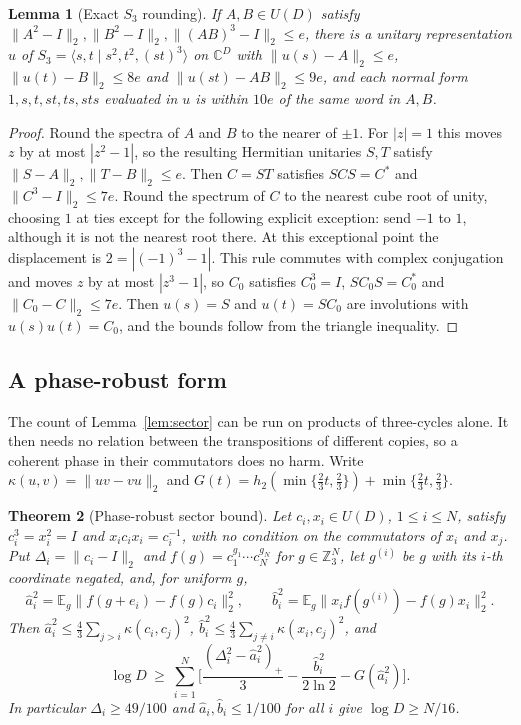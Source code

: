 \documentclass[11pt,a4paper]{article}
\theoremstyle{plain}
\newtheorem{theorem}{Theorem}[section]
\newtheorem{lemma}[theorem]{Lemma}
\theoremstyle{definition}
\theoremstyle{remark}
\begin{document}
\begin{lemma}[Exact $S_3$ rounding]\label{lem:s3round}
If $A,B\in U(D)$ satisfy $\|A^2-I\|_2,\|B^2-I\|_2,\|(AB)^3-I\|_2\le e$, there is a unitary representation $u$ of
$S_3=\langle s,t\mid s^2,t^2,(st)^3\rangle$ on $\mathbb C^D$ with $\|u(s)-A\|_2\le e$, $\|u(t)-B\|_2\le8e$ and $\|u(st)-AB\|_2\le9e$, and
each normal form $1,s,t,st,ts,sts$ evaluated in $u$ is within $10e$ of the same word in $A,B$.
\end{lemma}

\begin{proof}
Round the spectra of $A$ and $B$ to the nearer of $\pm1$. For $|z|=1$ this moves $z$ by at most $|z^2-1|$, so the resulting
Hermitian unitaries $S,T$ satisfy $\|S-A\|_2,\|T-B\|_2\le e$. Then $C=ST$ satisfies $SCS=C^*$ and $\|C^3-I\|_2\le7e$. Round the spectrum
of $C$ to the nearest cube root of unity, choosing $1$ at ties except for the following explicit exception: send $-1$ to $1$, although
it is not the nearest root there. At this exceptional point the displacement is $2=|(-1)^3-1|$. This rule commutes with complex conjugation and moves
$z$ by at most $|z^3-1|$, so $C_0$ satisfies $C_0^3=I$, $SC_0S=C_0^*$ and $\|C_0-C\|_2\le7e$. Then $u(s)=S$ and $u(t)=SC_0$ are
involutions with $u(s)u(t)=C_0$, and the bounds follow from the triangle inequality.
\end{proof}

\subsection{A phase-robust form}

The count of Lemma~\ref{lem:sector} can be run on products of three-cycles alone. It then needs no relation between the
transpositions of different copies, so a coherent phase in their commutators does no harm. Write $\kappa(u,v)=\|uv-vu\|_2$ and
$G(t)=h_2(\min\{\frac23t,\frac23\})+\min\{\frac23t,\frac23\}$.

\begin{theorem}[Phase-robust sector bound]\label{thm:phase-robust}
Let $c_i,x_i\in U(D)$, $1\le i\le N$, satisfy $c_i^3=x_i^2=I$ and $x_ic_ix_i=c_i^{-1}$, with no condition on the commutators of
$x_i$ and $x_j$. Put $\Delta_i=\|c_i-I\|_2$ and $f(g)=c_1^{g_1}\cdots c_N^{g_N}$ for $g\in\mathbb Z_3^N$, let $g^{(i)}$ be $g$ with its
$i$-th coordinate negated, and, for uniform $g$,
\[
\hat a_i^2=\mathbb E_g\|f(g+e_i)-f(g)c_i\|_2^2,\qquad \hat b_i^2=\mathbb E_g\|x_if(g^{(i)})-f(g)x_i\|_2^2 .
\]
Then $\hat a_i^2\le\frac43\sum_{j>i}\kappa(c_i,c_j)^2$, $\hat b_i^2\le\frac43\sum_{j\ne i}\kappa(x_i,c_j)^2$, and
\[
\log D\ \ge\ \sum_{i=1}^N\Big[\frac{(\Delta_i^2-\hat a_i^2)_+}3-\frac{\hat b_i^2}{2\ln2}-G(\hat a_i^2)\Big].
\]
In particular $\Delta_i\ge49/100$ and $\hat a_i,\hat b_i\le1/100$ for all $i$ give $\log D\ge N/16$.
\end{theorem}
\end{document}
